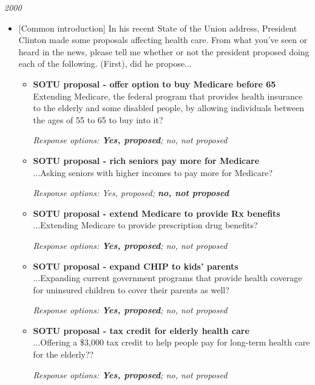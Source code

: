 \documentclass[12pt, letterpaper]{article}
\begin{document}
 \large \noindent \textit{2000} 
\normalsize
\begin{itemize}
\item{[Common introduction] In his recent State of the Union address, President Clinton made some proposals affecting health care. From what you've seen or heard in the news, please tell me whether or not the president proposed doing each of the following. (First), did he propose...

   \begin{itemize}
\item \textbf{SOTU proposal - offer option to buy Medicare before 65} \\
Extending Medicare, the federal program that provides health insurance to the elderly and some disabled people, by allowing individuals between the ages of 55 to 65 to buy into it?

\textit{Response options: \textbf{Yes, proposed}; no, not proposed}
\end{itemize}

   \begin{itemize}
\item \textbf{SOTU proposal - rich seniors pay more for Medicare} \\
...Asking seniors with higher incomes to pay more for Medicare?

\textit{Response options: Yes, proposed; \textbf{no, not proposed}}
\end{itemize}

   \begin{itemize}
\item \textbf{SOTU proposal - extend Medicare to provide Rx benefits} \\
...Extending Medicare to provide prescription drug benefits?

\textit{Response options: \textbf{Yes, proposed}; no, not proposed}
\end{itemize}

   \begin{itemize}
\item \textbf{SOTU proposal - expand CHIP to kids' parents} \\
...Expanding current government programs that provide health coverage for uninsured children to cover their parents as well?

\textit{Response options: \textbf{Yes, proposed}; no, not proposed}
\end{itemize}

   \begin{itemize}
\item \textbf{SOTU proposal - tax credit for elderly health care} \\
...Offering a \$3,000 tax credit to help people pay for long-term health care for the elderly??

\textit{Response options: \textbf{Yes, proposed}; no, not proposed}
\end{itemize}}
\end{itemize}
\end{document}

